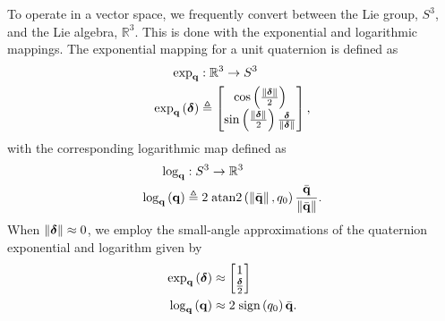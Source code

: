 To operate in a vector space, we frequently convert between the Lie group,
$S^3$, and the Lie algebra, $\mathbb{R}^3$.
This is done with the
exponential and logarithmic mappings. The exponential mapping for a unit quaternion is defined as
\begin{align}
\exp_{\boldsymbol{\mathrm{q}}} & :\mathbb{R}^{3}\rightarrow S^3\nonumber \\
\exp_{\boldsymbol{\mathrm{q}}}\left(\boldsymbol{\mathrm{\delta}}\right) & \triangleq\begin{bmatrix}\cos\left(\frac{\lVert\boldsymbol{\mathrm{\delta}}\rVert}{2}\right)\\
\sin\left(\frac{\lVert\boldsymbol{\mathrm{\delta}}\rVert}{2}\right)\frac{\boldsymbol{\mathrm{\delta}}}{\lVert\boldsymbol{\mathrm{\delta}}\rVert}
\end{bmatrix},\label{eqn:exponential_map}
\end{align}
with the corresponding logarithmic map defined as
\begin{align}
\log_{\boldsymbol{\mathrm{q}}} & :S^3\rightarrow \mathbb{R}^{3}\nonumber \\
\log_{\boldsymbol{\mathrm{q}}}\left(\boldsymbol{\mathrm{q}}\right) & \triangleq2\;\mathrm{atan2}\left(\left\Vert \bar{\boldsymbol{\mathrm{q}}}\right\Vert ,q_{0}\right)\frac{\bar{\boldsymbol{\mathrm{q}}}}{\left\Vert \bar{\boldsymbol{\mathrm{q}}}\right\Vert }.\label{eqn:log_map}
\end{align}
When $\left\Vert \boldsymbol{\mathrm{\delta}}\right\Vert\approx0$,
we employ the small-angle approximations of the quaternion exponential and
logarithm given by
\begin{align}
\exp_{\boldsymbol{\mathrm{q}}}\left(\boldsymbol{\mathrm{\delta}}\right) & \approx\begin{bmatrix}1\\
\frac{\boldsymbol{\mathrm{\delta}}}{2}
\end{bmatrix}\label{eq:est_paper_quaternion_exp_approx}\\
\log_{\boldsymbol{\mathrm{q}}}\left(\boldsymbol{\mathrm{q}}\right) & \approx2\;\textrm{sign}\left(q_{0}\right)\bar{\boldsymbol{\mathrm{q}}}.\label{eq:quaternion_log_approx}
\end{align}



